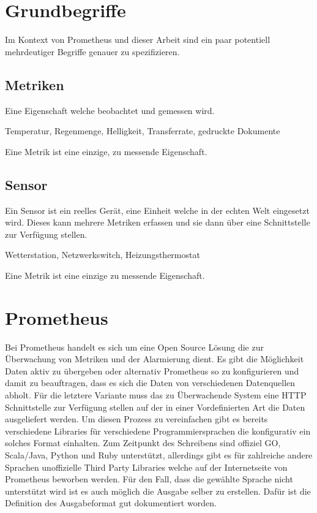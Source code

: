 \section{Grundbegriffe}
Im Kontext von Prometheus und dieser Arbeit sind ein paar potentiell mehrdeutiger Begriffe genauer zu spezifizieren.
\subsection{Metriken}
Eine Eigenschaft welche beobachtet und gemessen wird.
\begin{Beispiel}
	Temperatur, Regenmenge, Helligkeit, Transferrate, gedruckte Dokumente
\end{Beispiel}
\begin{Definition}
	Eine Metrik ist eine einzige, zu messende Eigenschaft.
\end{Definition}
\subsection{Sensor}
Ein Sensor ist ein reelles Gerät, eine Einheit welche in der echten Welt eingesetzt wird. Dieses kann mehrere Metriken erfassen und sie dann über eine Schnittstelle zur Verfügung stellen.
\begin{Beispiel}
	Wetterstation, Netzwerkswitch, Heizungsthermostat
\end{Beispiel}
\begin{Definition}
	Eine Metrik ist eine einzige zu messende Eigenschaft.
\end{Definition}

\section{Prometheus}
Bei Prometheus handelt es sich um eine Open Source Lösung die zur Überwachung von Metriken und der Alarmierung dient. Es gibt die Möglichkeit Daten aktiv zu übergeben oder alternativ Prometheus so zu konfigurieren und damit zu beauftragen, dass es sich die Daten von verschiedenen Datenquellen abholt. Für die letztere Variante muss das zu Überwachende System eine HTTP Schnittstelle zur Verfügung stellen auf der in einer Vordefinierten Art die Daten ausgeliefert werden. Um diesen Prozess zu vereinfachen gibt es bereits verschiedene Libraries für verschiedene Programmiersprachen die konfigurativ ein solches Format einhalten. Zum Zeitpunkt des Schreibens sind offiziel GO, Scala/Java, Python und Ruby unterstützt, allerdings gibt es für zahlreiche andere Sprachen unoffizielle Third Party Libraries welche auf der Internetseite von Prometheus beworben werden. Für den Fall, dass die gewählte Sprache nicht unterstützt wird ist es auch möglich die Ausgabe selber zu erstellen. Dafür ist die Definition des Ausgabeformat gut dokumentiert worden. 
